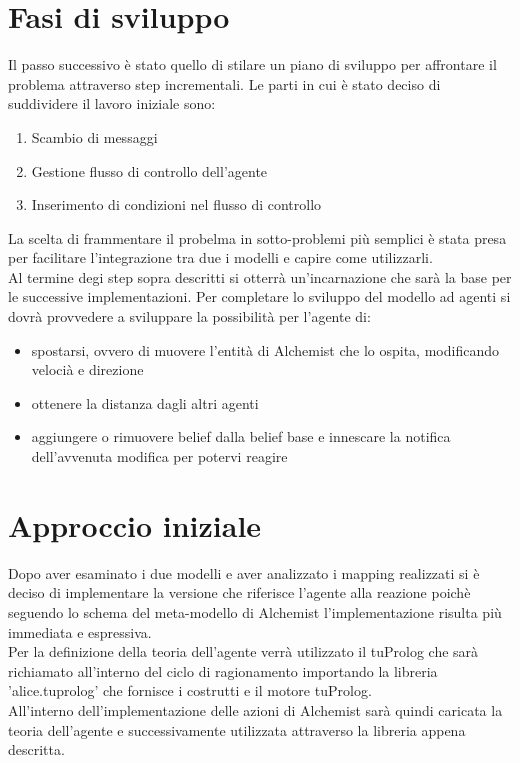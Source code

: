 \documentclass[12pt,a4paper,openright,twoside]{report}
\begin{document}
\section{Fasi di sviluppo}
Il passo successivo \`e stato quello di stilare un piano di sviluppo per affrontare il problema attraverso step incrementali. Le parti in cui \`e stato deciso di suddividere il lavoro iniziale sono:
\begin{enumerate}
   \item Scambio di messaggi
   \item Gestione flusso di controllo dell'agente
   \item Inserimento di condizioni nel flusso di controllo
\end{enumerate}

La scelta di frammentare il probelma in sotto-problemi pi\`u semplici \`e stata presa per facilitare l'integrazione tra due i modelli e capire come utilizzarli.
\\
Al termine degi step sopra descritti si otterr\`a un'incarnazione che sar\`a la base per le successive implementazioni. Per completare lo sviluppo del modello ad agenti si dovr\`a provvedere a sviluppare la possibilit\`a per l'agente di:
\begin{itemize}
   \item spostarsi, ovvero di muovere l'entit\`a di Alchemist che lo ospita, modificando veloci\`a e direzione
   \item ottenere la distanza dagli altri agenti
   \item aggiungere o rimuovere belief dalla belief base e innescare la notifica dell'avvenuta modifica per potervi reagire
\end{itemize}


\section{Approccio iniziale}

Dopo aver esaminato i due modelli e aver analizzato i mapping realizzati si \`e deciso di implementare la versione che riferisce l'agente alla reazione poich\`e seguendo lo schema del meta-modello di Alchemist l'implementazione risulta pi\`u immediata e espressiva.
\\
Per la definizione della teoria dell'agente verr\`a utilizzato il tuProlog che sar\`a richiamato all'interno del ciclo di ragionamento importando la libreria 'alice.tuprolog' che fornisce i costrutti e il motore tuProlog.
\\
All'interno dell'implementazione delle azioni di Alchemist sar\`a quindi caricata la teoria dell'agente e successivamente utilizzata attraverso la libreria appena descritta.
\end{document}
